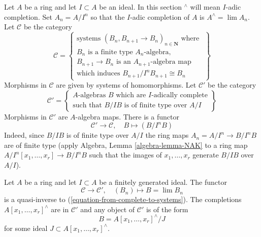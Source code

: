 \noindent
Let $A$ be a ring and let $I \subset A$ be an ideal.
In this section ${}^\wedge$ will mean $I$-adic completion.
Set $A_n = A/I^n$ so that the $I$-adic completion of $A$ is
$A^\wedge = \lim A_n$. Let $\mathcal{C}$ be the
category
\begin{equation}
\label{equation-C}
\mathcal{C} =
\left\{
\begin{matrix}
\text{systems }(B_n, B_{n + 1} \to B_n)_{n \in \mathbf{N}}\text{ where }\\
B_n\text{ is a finite type }A_n\text{-algebra,}\\
B_{n + 1} \to B_n\text{ is an }A_{n + 1}\text{-algebra map}\\
\text{which induces }B_{n + 1}/I^nB_{n + 1} \cong B_n
\end{matrix}
\right\}
\end{equation}
Morphisms in $\mathcal{C}$ are given by systems of homomorphisms.
Let $\mathcal{C}'$ be the category
\begin{equation}
\label{equation-C-prime}
\mathcal{C}' =
\left\{
\begin{matrix}
A\text{-algebras }B\text{ which are }I\text{-adically complete}\\
\text{such that }B/IB\text{ is of finite type over }A/I
\end{matrix}
\right\}
\end{equation}
Morphisms in $\mathcal{C}'$ are $A$-algebra maps. There is a functor
\begin{equation}
\label{equation-from-complete-to-systems}
\mathcal{C}' \longrightarrow \mathcal{C},\quad
B \longmapsto (B/I^nB)
\end{equation}
Indeed, since $B/IB$ is of finite type over $A/I$ the ring maps
$A_n = A/I^n \to B/I^nB$ are of finite type
(apply Algebra, Lemma \ref{algebra-lemma-NAK}
to a ring map $A/I^n[x_1, \ldots, x_r] \to B/I^nB$
such that the images of $x_1, \ldots, x_r$ generate $B/IB$
over $A/I$).

\begin{lemma}
\label{lemma-topologically-finite-type}
Let $A$ be a ring and let $I \subset A$ be a finitely generated ideal.
The functor
$$
\mathcal{C} \longrightarrow \mathcal{C}',\quad
(B_n) \longmapsto B = \lim B_n
$$
is a quasi-inverse to (\ref{equation-from-complete-to-systems}).
The completions $A[x_1, \ldots, x_r]^\wedge$ are in $\mathcal{C}'$ and
any object of $\mathcal{C}'$ is of the form
$$
B = A[x_1, \ldots, x_r]^\wedge / J
$$
for some ideal $J \subset A[x_1, \ldots, x_r]^\wedge$.
\end{lemma}

